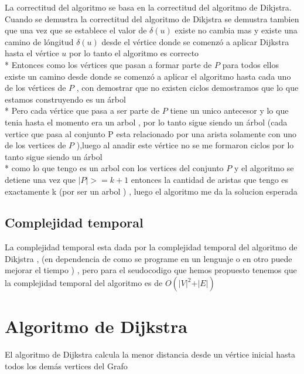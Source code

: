 \documentclass[10pt]{article}
\begin{document}
    \noindent La correctitud del algoritmo se basa en la correctitud del algoritmo de Dikjstra.
    Cuando se demustra la correctitud del algoritmo de Dikjstra se demustra tambien que una vez que se establece el valor de $\delta\left(u\right)$ existe no cambia mas y existe una camino de l\'ongitud  $\delta\left(u\right)$ desde el v\'ertice donde se comenz\'o a aplicar Dijkstra hasta el v\'ertice $u$ por lo tanto el algoritmo es correcto 
    \\*
    Entonces como los v\'ertices que pasan a formar parte de $P$ para todos ellos existe un camino desde donde se comenz\'o a aplicar el algoritmo  hasta cada uno de los v\'ertices de $P$ , con demostrar que no existen ciclos  demostramos que lo que estamos construyendo es un \'arbol 
    \\*
    Pero cada v\'ertice que pasa a ser parte de $P$ tiene un unico antecesor y lo  que tenia hasta el momento era un arbol , por lo tanto sigue siendo un \'arbol  (cada vertice que pasa al conjunto P esta relacionado por una arista solamente con uno de los vertices de $P$ ),luego al anadir este v\'ertice no se me formaron ciclos por lo tanto sigue siendo un \'arbol
    \\*
    como lo que tengo es un arbol con los vertices del conjunto $P$ y el algoritmo se detiene una vez que $\vert P  \vert >= k+1$ entonces la cantidad de aristas que tengo es exactamente k (por ser un arbol ) , luego el algoritmo me da la solucion esperada 

    \subsection{Complejidad temporal } 

    \noindent La complejidad temporal esta dada por la complejidad temporal del algoritmo de Dikjstra , (en dependencia de como se programe en un lenguaje o en otro puede mejorar el tiempo ) , pero para el seudocodigo que hemos propuesto tenemos que la complejidad temporal del algoritmo es de $O \left(\vert V \vert^2  + \vert E \vert \right)$ 



    \section{Algoritmo de Dijkstra}

    \noindent El algoritmo de Dijkstra calcula la menor distancia desde un v\'ertice inicial hasta todos los dem\'as vertices del Grafo  
\end{document}
